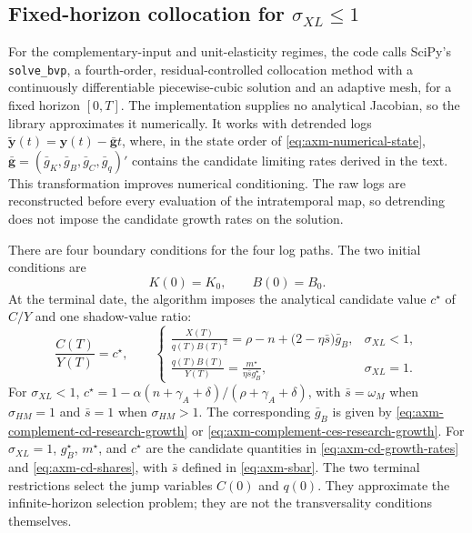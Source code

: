 \subsection{Fixed-horizon collocation for \texorpdfstring{\(\sigma_{XL}\leq1\)}{sigma XL <= 1}}

For the complementary-input and unit-elasticity regimes, the code calls
SciPy's \texttt{solve\_bvp}, a fourth-order, residual-controlled collocation
method with a continuously differentiable piecewise-cubic solution and an
adaptive mesh, for a fixed horizon \([0,T]\). The implementation supplies no
analytical Jacobian, so the library approximates it numerically.
It works with detrended logs
\(\widetilde{\mathbf y}(t)=\mathbf y(t)-\bar{\mathbf g}t\), where, in the state
order of \eqref{eq:axm-numerical-state},
\(\bar{\mathbf g}=(\bar g_K,\bar g_B,\bar g_C,\bar g_q)'\) contains the candidate
limiting rates derived in the text. This transformation improves numerical
conditioning. The raw logs are reconstructed before every evaluation of the
intratemporal map, so detrending does not impose the candidate growth rates on
the solution.

There are four boundary conditions for the four log paths. The two initial
conditions are
\begin{equation}
 K(0)=K_0,\qquad B(0)=B_0.
 \label{eq:axm-fixed-initial-boundary}
\end{equation}
At the terminal date, the algorithm imposes the analytical candidate value
\(c^\star\) of \(C/Y\) and one shadow-value ratio:
\begin{equation}
 \frac{C(T)}{Y(T)}=c^\star,\qquad
 \begin{cases}
 \displaystyle
 \frac{X(T)}{q(T)B(T)^2}
 =\rho-n+\bigl(2-\eta\bar s\bigr)\bar g_B,
 &\sigma_{XL}<1,\\[9pt]
 \displaystyle
 \frac{q(T)B(T)}{Y(T)}
 =\frac{m^\star}{\eta\bar s g_B^\star},
 &\sigma_{XL}=1.
 \end{cases}
 \label{eq:axm-fixed-terminal-boundary}
\end{equation}
For \(\sigma_{XL}<1\),
\(c^\star=1-\alpha(n+\gamma_A+\delta)/(\rho+\gamma_A+\delta)\), with
\(\bar s=\omega_M\) when \(\sigma_{HM}=1\) and \(\bar s=1\) when
\(\sigma_{HM}>1\). The corresponding \(\bar g_B\) is given by
\eqref{eq:axm-complement-cd-research-growth} or
\eqref{eq:axm-complement-ces-research-growth}. For \(\sigma_{XL}=1\),
\(g_B^\star\), \(m^\star\), and \(c^\star\) are the candidate quantities in
\eqref{eq:axm-cd-growth-rates} and \eqref{eq:axm-cd-shares}, with \(\bar s\)
defined in \eqref{eq:axm-sbar}. The two terminal restrictions select the jump
variables \(C(0)\) and \(q(0)\). They approximate the infinite-horizon selection
problem; they are not the transversality conditions themselves.

